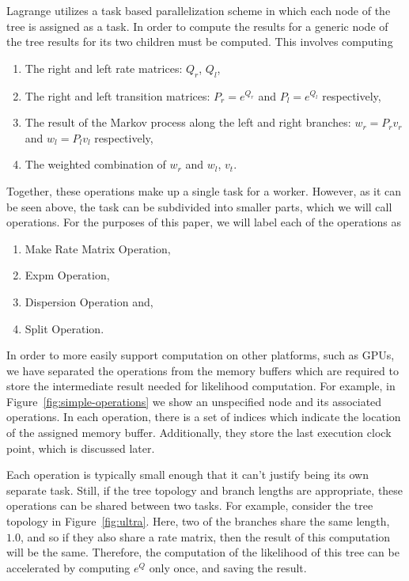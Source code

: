 \documentclass{article}
\begin{document}
Lagrange utilizes a task based parallelization scheme in which each node of the tree is assigned as a task. In order to
compute the results for a generic node of the tree results for its two children must be computed. This involves
computing
\begin{enumerate}
  \item The right and left rate matrices: $Q_r$, $Q_l$,
  \item The right and left transition matrices: $P_r = e^{Q_r}$ and $P_l = e^{Q_l}$ respectively,
  \item The result of the Markov process along the left and right branches: $w_r = P_r v_r$ and $w_l = P_l v_l$
        respectively,
  \item The weighted combination of $w_r$ and $w_l$, $v_t$.
\end{enumerate}
Together, these operations make up a single task for a worker. However, as it can be seen above, the task can be
subdivided into smaller parts, which we will call operations. For the purposes of this paper, we will label each of the
operations as
\begin{enumerate}
  \item Make Rate Matrix Operation,
  \item Expm Operation,
  \item Dispersion Operation and,
  \item Split Operation.
\end{enumerate}
In order to more easily support computation on other platforms, such as GPUs, we have separated the operations from the
memory buffers which are required to store the intermediate result needed for likelihood computation. For example, in
Figure~\ref{fig:simple-operations} we show an unspecified node and its associated operations. In each operation, there
is a set of indices which indicate the location of the assigned memory buffer. Additionally, they store the last
execution clock point, which is discussed later.

Each operation is typically small enough that it can't justify being its own separate task. Still, if the tree
topology and branch lengths are appropriate, these operations can be shared between two tasks. For example, consider the
tree topology in Figure~\ref{fig:ultra}. Here, two of the branches share the same length, $1.0$, and so if they also
share a rate matrix, then the result of this computation will be the same. Therefore, the computation of the likelihood
of this tree can be accelerated by computing $e^Q$ only once, and saving the result.
\end{document}

